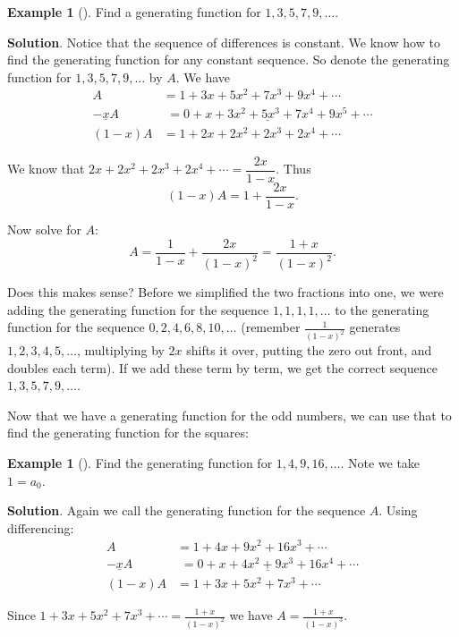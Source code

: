 \documentclass[10pt,]{book}
\theoremstyle{plain}
\theoremstyle{definition}
\theoremstyle{definition}
\newtheorem{example}[theorem]{Example}
\theoremstyle{definition}
\theoremstyle{definition}
\numberwithin{equation}{chapter}
\def\d{\displaystyle}
\newcommand{\amp}{&}
\begin{document}
\begin{example}[]\label{example-23}
\hypertarget{p-1087}{}%
Find a generating function for \(1, 3, 5, 7, 9,\ldots\).%
\par\smallskip%
\noindent\textbf{Solution}.\hypertarget{solution-97}{}\quad%
\hypertarget{p-1088}{}%
Notice that the sequence of differences is constant. We know how to find the generating function for any constant sequence. So denote the generating function for \(1, 3, 5, 7, 9, \ldots\) by \(A\). We have%
\begin{align*}
A \amp  = 1 + 3x + 5x^2 + 7x^3 + 9x^4 + \cdots\\
\underline{-xA} \amp  \underline{\,\,= 0 + x + 3x^2 +  5x^3 + 7x^4 + 9x^5 + \cdots}\\
(1-x)A \amp  = 1 + 2x + 2x^2 + 2x^3 + 2x^4 + \cdots
\end{align*}
%
\par
\hypertarget{p-1089}{}%
We know that \(2x + 2x^2 + 2x^3 + 2x^4 + \cdots = \dfrac{2x}{1-x}\). Thus%
\begin{equation*}
(1-x)A = 1 + \frac{2x}{1-x}.
\end{equation*}
%
\par
\hypertarget{p-1090}{}%
Now solve for \(A\):%
\begin{equation*}
A = \frac{1}{1-x} + \frac{2x}{(1-x)^2} = \frac{1+x}{(1-x)^2}.
\end{equation*}
%
\par
\hypertarget{p-1091}{}%
Does this makes sense? Before we simplified the two fractions into one, we were adding the generating function for the sequence \(1,1,1,1,\ldots\) to the generating function for the sequence \(0, 2, 4, 6, 8, 10, \ldots\) (remember \(\frac{1}{(1-x)^2}\) generates \(1,2,3,4,5, \ldots\), multiplying by \(2x\) shifts it over, putting the zero out front, and doubles each term). If we add these term by term, we get the correct sequence \(1,3,5,7, 9, \ldots\).%
\end{example}
\hypertarget{p-1092}{}%
Now that we have a generating function for the odd numbers, we can use that to find the generating function for the squares:%
\begin{example}[]\label{example-24}
\hypertarget{p-1093}{}%
Find the generating function for \(1, 4, 9, 16, \ldots\). Note we take \(1 = a_0\).%
\par\smallskip%
\noindent\textbf{Solution}.\hypertarget{solution-98}{}\quad%
\hypertarget{p-1094}{}%
Again we call the generating function for the sequence \(A\). Using differencing:%
\begin{align*}
A \amp  = 1 + 4x + 9x^2 + 16x^3 + \cdots\\
\underline{- xA} \amp  \underline{\,\, = 0 + x + 4x^2 + 9x^3 + 16x^4 + \cdots}\\
(1-x)A \amp  = 1 + 3x + 5x^2 + 7x^3 + \cdots
\end{align*}
%
\par
\hypertarget{p-1095}{}%
Since \(1 + 3x + 5x^2 + 7x^3 + \cdots = \d\frac{1+x}{(1-x)^2}\) we have \(A = \d\frac{1+x}{(1-x)^3}\).%
\end{example}
\end{document}
